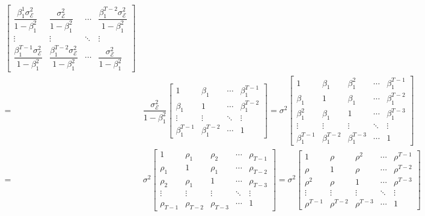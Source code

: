 \documentclass[
]{book}
\theoremstyle{definition}
\theoremstyle{definition}
\theoremstyle{definition}
\theoremstyle{definition}
\theoremstyle{remark}
\begin{document}
\[\begin{aligned}
\begin{bmatrix}
\dfrac{\beta_{1}^{1}\sigma_{\mathcal{E}}^{2}}{1-\beta_{1}^{2}} & \dfrac{\sigma_{\mathcal{E}}^{2}}{1-\beta_{1}^{2}} & \cdots & \dfrac{\beta_{1}^{T-2}\sigma_{\mathcal{E}}^{2}}{1-\beta_{1}^{2}}\\
\vdots & \vdots & \ddots & \vdots\\
\dfrac{\beta_{1}^{T-1}\sigma_{\mathcal{E}}^{2}}{1-\beta_{1}^{2}} & \dfrac{\beta_{1}^{T-2}\sigma_{\mathcal{E}}^{2}}{1-\beta_{1}^{2}} & \cdots & \dfrac{\sigma_{\mathcal{E}}^{2}}{1-\beta_{1}^{2}}
\end{bmatrix}\\
= & \dfrac{\sigma_{\mathcal{E}}^{2}}{1-\beta_{1}^{2}}\begin{bmatrix}1 & \beta_{1} & \cdots & \beta_{1}^{T-1}\\
\beta_{1} & 1 & \cdots & \beta_{1}^{T-2}\\
\vdots & \vdots & \ddots & \vdots\\
\beta_{1}^{T-1} & \beta_{1}^{T-2} & \cdots & 1
\end{bmatrix}=\sigma^{2}\begin{bmatrix}1 & \beta_{1} & \beta_{1}^{2} & \cdots & \beta_{1}^{T-1}\\
\beta_{1} & 1 & \beta_{1} & \cdots & \beta_{1}^{T-2}\\
\beta_{1}^{2} & \beta_{1} & 1 & \cdots & \beta_{1}^{T-3}\\
\vdots & \vdots & \vdots & \ddots & \vdots\\
\beta_{1}^{T-1} & \beta_{1}^{T-2} & \beta_{1}^{T-3} & \cdots & 1
\end{bmatrix}\\
= & \sigma^{2}\begin{bmatrix}1 & \rho_{1} & \rho_{2} & \cdots & \rho_{T-1}\\
\rho_{1} & 1 & \rho_{1} & \cdots & \rho_{T-2}\\
\rho_{2} & \rho_{1} & 1 & \cdots & \rho_{T-3}\\
\vdots & \vdots & \vdots & \ddots & \vdots\\
\rho_{T-1} & \rho_{T-2} & \rho_{T-3} & \cdots & 1
\end{bmatrix}=\sigma^{2}\begin{bmatrix}1 & \rho & \rho^{2} & \cdots & \rho^{T-1}\\
\rho & 1 & \rho & \cdots & \rho^{T-2}\\
\rho^{2} & \rho & 1 & \cdots & \rho^{T-3}\\
\vdots & \vdots & \vdots & \ddots & \vdots\\
\rho^{T-1} & \rho^{T-2} & \rho^{T-3} & \cdots & 1
\end{bmatrix}
\end{aligned}
\]
\end{document}
